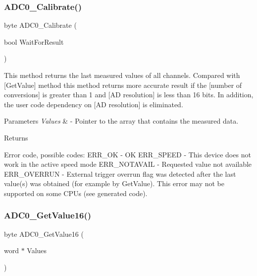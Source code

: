 \subsubsection{\texorpdfstring{A\+D\+C0\+\_\+\+Calibrate()}{ADC0\_Calibrate()}}
{\footnotesize\ttfamily byte A\+D\+C0\+\_\+\+Calibrate (\begin{DoxyParamCaption}\item[{bool}]{Wait\+For\+Result }\end{DoxyParamCaption})}



This method returns the last measured values of all channels. Compared with \mbox{[}Get\+Value\mbox{]} method this method returns more accurate result if the \mbox{[}number of conversions\mbox{]} is greater than 1 and \mbox{[}AD resolution\mbox{]} is less than 16 bits. In addition, the user code dependency on \mbox{[}AD resolution\mbox{]} is eliminated. 


\begin{DoxyParams}{Parameters}
{\em Values} & -\/ Pointer to the array that contains the measured data. \\
\hline
\end{DoxyParams}
\begin{DoxyReturn}{Returns}

\begin{DoxyItemize}
\item Error code, possible codes\+: E\+R\+R\+\_\+\+OK -\/ OK E\+R\+R\+\_\+\+S\+P\+E\+ED -\/ This device does not work in the active speed mode E\+R\+R\+\_\+\+N\+O\+T\+A\+V\+A\+IL -\/ Requested value not available E\+R\+R\+\_\+\+O\+V\+E\+R\+R\+UN -\/ External trigger overrun flag was detected after the last value(s) was obtained (for example by Get\+Value). This error may not be supported on some C\+P\+Us (see generated code). 
\end{DoxyItemize}
\end{DoxyReturn}
\mbox{\label{group___a_d_c0__module_ga60e325e636a51cf5c40b1ae5d887571e}} 
\subsubsection{\texorpdfstring{A\+D\+C0\+\_\+\+Get\+Value16()}{ADC0\_GetValue16()}}
{\footnotesize\ttfamily byte A\+D\+C0\+\_\+\+Get\+Value16 (\begin{DoxyParamCaption}\item[{word $\ast$}]{Values }\end{DoxyParamCaption})}



